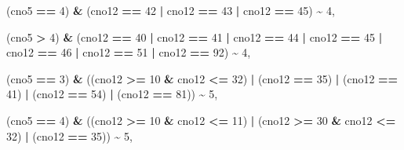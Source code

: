 \documentclass[
]{article}
\newenvironment{Shaded}{\begin{snugshade}}{\end{snugshade}}
\newcommand{\DecValTok}[1]{\textcolor[rgb]{0.00,0.00,0.81}{#1}}
\newcommand{\NormalTok}[1]{#1}
\newcommand{\SpecialCharTok}[1]{\textcolor[rgb]{0.81,0.36,0.00}{\textbf{#1}}}
\begin{document}
\begin{Shaded}
\begin{Highlighting}[]
\NormalTok{                        (cno5 }\SpecialCharTok{==} \DecValTok{4}\NormalTok{) }\SpecialCharTok{\&}\NormalTok{ (cno12 }\SpecialCharTok{==} \DecValTok{42} \SpecialCharTok{|}\NormalTok{ cno12 }\SpecialCharTok{==} \DecValTok{43} \SpecialCharTok{|}\NormalTok{ cno12 }\SpecialCharTok{==} \DecValTok{45}\NormalTok{) }\SpecialCharTok{\textasciitilde{}} \DecValTok{4}\NormalTok{,}
                        
\NormalTok{                        (cno5 }\SpecialCharTok{\textgreater{}} \DecValTok{4}\NormalTok{) }\SpecialCharTok{\&}\NormalTok{ (cno12 }\SpecialCharTok{==} \DecValTok{40} \SpecialCharTok{|}\NormalTok{ cno12 }\SpecialCharTok{==} \DecValTok{41} \SpecialCharTok{|}\NormalTok{ cno12 }\SpecialCharTok{==} \DecValTok{44} \SpecialCharTok{|}\NormalTok{ cno12 }\SpecialCharTok{==} \DecValTok{45} \SpecialCharTok{|} 
\NormalTok{                        cno12 }\SpecialCharTok{==} \DecValTok{46} \SpecialCharTok{|}\NormalTok{ cno12 }\SpecialCharTok{==} \DecValTok{51} \SpecialCharTok{|}\NormalTok{ cno12 }\SpecialCharTok{==} \DecValTok{92}\NormalTok{) }\SpecialCharTok{\textasciitilde{}} \DecValTok{4}\NormalTok{,}
                        
\NormalTok{                        (cno5 }\SpecialCharTok{==} \DecValTok{3}\NormalTok{) }\SpecialCharTok{\&}\NormalTok{ ((cno12 }\SpecialCharTok{\textgreater{}=} \DecValTok{10} \SpecialCharTok{\&}\NormalTok{ cno12 }\SpecialCharTok{\textless{}=} \DecValTok{32}\NormalTok{) }\SpecialCharTok{|}\NormalTok{ (cno12 }\SpecialCharTok{==} \DecValTok{35}\NormalTok{) }\SpecialCharTok{|}\NormalTok{ (cno12 }\SpecialCharTok{==} \DecValTok{41}\NormalTok{) }\SpecialCharTok{|} 
\NormalTok{                        (cno12 }\SpecialCharTok{==} \DecValTok{54}\NormalTok{) }\SpecialCharTok{|}\NormalTok{ (cno12 }\SpecialCharTok{==} \DecValTok{81}\NormalTok{)) }\SpecialCharTok{\textasciitilde{}} \DecValTok{5}\NormalTok{,}
                        
\NormalTok{                        (cno5 }\SpecialCharTok{==} \DecValTok{4}\NormalTok{) }\SpecialCharTok{\&}\NormalTok{ ((cno12 }\SpecialCharTok{\textgreater{}=} \DecValTok{10} \SpecialCharTok{\&}\NormalTok{ cno12 }\SpecialCharTok{\textless{}=} \DecValTok{11}\NormalTok{) }\SpecialCharTok{|}\NormalTok{ (cno12 }\SpecialCharTok{\textgreater{}=} \DecValTok{30} \SpecialCharTok{\&}\NormalTok{ cno12 }\SpecialCharTok{\textless{}=} \DecValTok{32}\NormalTok{) }\SpecialCharTok{|} 
\NormalTok{                        (cno12 }\SpecialCharTok{==} \DecValTok{35}\NormalTok{)) }\SpecialCharTok{\textasciitilde{}} \DecValTok{5}\NormalTok{,}
                        

\end{Highlighting}
\end{Shaded}
\end{document}

